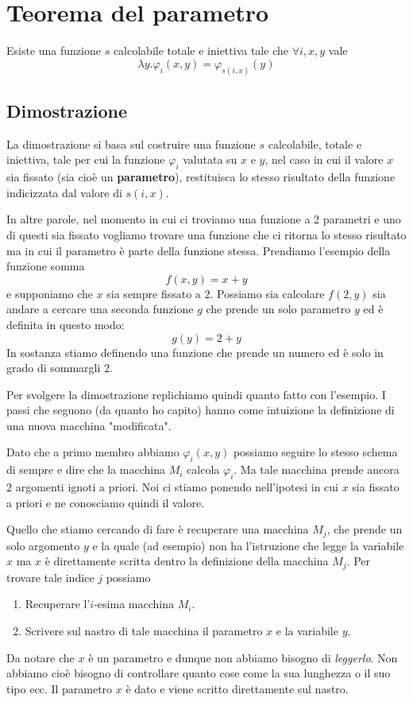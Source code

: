 \section{Teorema del parametro}

Esiste una funzione $s$ calcolabile totale e iniettiva tale che
$\forall i, x, y$ vale
\[ \lambda y . \varphi_i(x, y) = \varphi_{s(i,x)} (y) \]

\subsection{Dimostrazione}

La dimostrazione si basa sul costruire una funzione $s$
calcolabile, totale e iniettiva, tale per cui la funzione
$\varphi_i$ valutata su $x$ e $y$, nel caso in cui il valore
$x$ sia fissato (sia cioè un \textbf{parametro}), restituisca
lo stesso risultato della funzione indicizzata dal valore di
$s(i, x)$.

In altre parole, nel momento in cui ci troviamo una funzione
a 2 parametri e uno di questi sia fissato vogliamo trovare una
funzione che ci ritorna lo stesso risultato ma in cui il
parametro è parte della funzione stessa. Prendiamo l'esempio
della funzione somma
\[ f(x, y) = x + y \]
e supponiamo che $x$ sia sempre fissato a 2. Possiamo sia
calcolare $f(2, y)$ sia andare a cercare una seconda funzione
$g$ che prende un solo parametro $y$ ed è definita in questo
modo:
\[ g(y) = 2 + y \]
In sostanza stiamo definendo una funzione che prende un numero
ed è solo in grado di sommargli 2.

Per svolgere la dimostrazione replichiamo quindi quanto fatto
con l'esempio. I passi che seguono (da quanto ho capito) hanno
come intuizione la definizione di una nuova macchina
"modificata".

Dato che a primo membro abbiamo $\varphi_i (x,y)$ possiamo
seguire lo stesso schema di sempre e dire che la macchina $M_i$
calcola $\varphi_i$. Ma tale macchina prende ancora 2 argomenti
ignoti a priori. Noi ci stiamo ponendo nell'ipotesi in cui $x$
sia fissato a priori e ne conosciamo quindi il valore.

Quello che stiamo cercando di fare è recuperare una macchina
$M_j$, che prende un solo argomento $y$ e la quale (ad esempio)
non ha l'istruzione che legge la variabile $x$ ma $x$ è
direttamente scritta dentro la definizione della macchina $M_j$.
Per trovare tale indice $j$ possiamo
\begin{enumerate}
	\item Recuperare l'$i$-esima macchina $M_i$.
	\item Scrivere sul nastro di tale macchina il parametro $x$
	      e la variabile $y$.
\end{enumerate}
Da notare che $x$ è un parametro e dunque non abbiamo bisogno di
\emph{leggerlo}. Non abbiamo cioè bisogno di controllare quanto
cose come la sua lunghezza o il suo tipo ecc. Il parametro $x$
è dato e viene scritto direttamente sul nastro.

